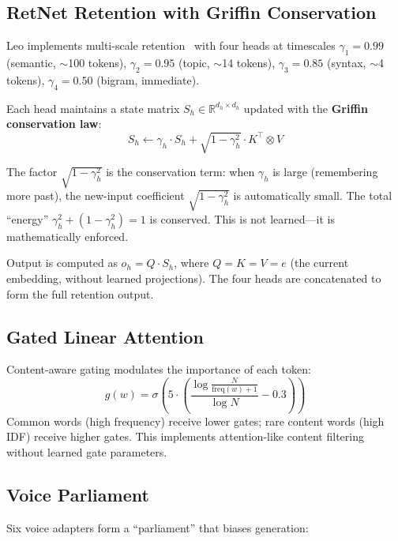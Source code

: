 \documentclass[11pt,twocolumn]{article}
\begin{document}
\subsection{RetNet Retention with Griffin Conservation}

Leo implements multi-scale retention~\citep{sun2023retentive} with four heads at timescales $\gamma_1 = 0.99$ (semantic, $\sim$100 tokens), $\gamma_2 = 0.95$ (topic, $\sim$14 tokens), $\gamma_3 = 0.85$ (syntax, $\sim$4 tokens), $\gamma_4 = 0.50$ (bigram, immediate).

Each head maintains a state matrix $S_h \in \mathbb{R}^{d_h \times d_h}$ updated with the \textbf{Griffin conservation law}:
\begin{equation}
\label{eq:griffin}
  S_h \leftarrow \gamma_h \cdot S_h + \sqrt{1 - \gamma_h^2} \cdot K^\top \otimes V
\end{equation}

The factor $\sqrt{1 - \gamma_h^2}$ is the conservation term: when $\gamma_h$ is large (remembering more past), the new-input coefficient $\sqrt{1 - \gamma_h^2}$ is automatically small. The total ``energy'' $\gamma_h^2 + (1 - \gamma_h^2) = 1$ is conserved. This is not learned---it is mathematically enforced.

Output is computed as $o_h = Q \cdot S_h$, where $Q = K = V = e$ (the current embedding, without learned projections). The four heads are concatenated to form the full retention output.

\subsection{Gated Linear Attention}

Content-aware gating modulates the importance of each token:
\begin{equation}
  g(w) = \sigma\!\left(5 \cdot \left(\frac{\log\frac{N}{\text{freq}(w) + 1}}{\log N} - 0.3\right)\right)
\end{equation}
Common words (high frequency) receive lower gates; rare content words (high IDF) receive higher gates. This implements attention-like content filtering without learned gate parameters.

\subsection{Voice Parliament}

Six voice adapters form a ``parliament'' that biases generation:
\end{document}
